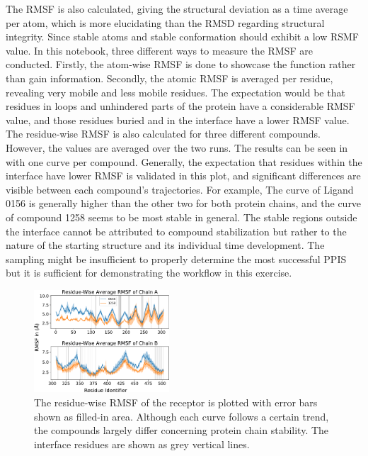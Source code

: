 \documentclass[9pt,tutorial]{livecoms}
\begin{document}
The RMSF is also calculated, giving the structural deviation as a time average per atom, which is more elucidating than the RMSD regarding structural integrity. Since stable atoms and stable conformation should exhibit a low RSMF value. In this notebook, three different ways to measure the RMSF are conducted. Firstly, the atom-wise RMSF is done to showcase the function rather than gain information. Secondly, the atomic RMSF is averaged per residue, revealing very mobile and less mobile residues. The expectation would be that residues in loops and unhindered parts of the protein have a considerable RMSF value, and those residues buried and in the interface have a lower RMSF value. The residue-wise RMSF is also calculated for three different compounds. However, the values are averaged over the two runs. The results can be seen in  with one curve per compound. Generally, the expectation that residues within the interface have lower RMSF is validated in this plot, and significant differences are visible between each compound's trajectories. For example, The curve of Ligand 0156 is generally higher than the other two for both protein chains, and the curve of compound 1258 seems to be most stable in general. The stable regions outside the interface cannot be attributed to compound stabilization but rather to the nature of the starting structure and its individual time development. The sampling might be insufficient to properly determine the most successful PPIS but it is sufficient for demonstrating the workflow in this exercise.

\begin{figure}[H]
    \centering
    \includegraphics[width=0.45\textwidth]{figures/RMSF_vs_resids.pdf}
    \caption{The residue-wise RMSF of the receptor is plotted with error bars shown as filled-in area. Although each curve follows a certain trend, the compounds largely differ concerning protein chain stability. The interface residues are shown as grey vertical lines.}
    \label{fig:6_rmsfresidues}
\end{figure}
\end{document}
